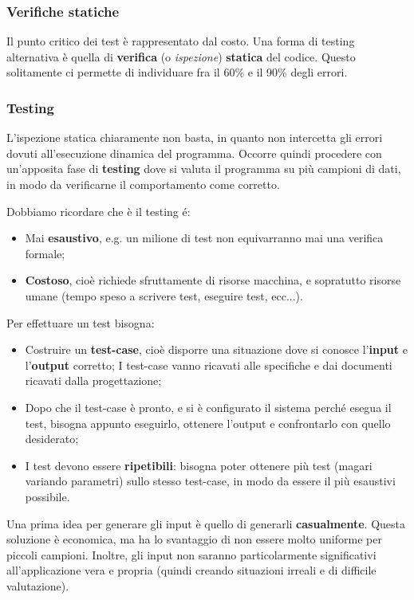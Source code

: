 \documentclass[a4paper,11pt]{article}
\begin{document}
\subsubsection{Verifiche statiche}
Il punto critico dei test è rappresentato dal costo. Una forma di testing alternativa è quella di \textbf{verifica} (o \textit{ispezione}) \textbf{statica} del codice.
Questo solitamente ci permette di individuare fra il 60\% e il 90\% degli errori.

\subsubsection{Testing}
L'ispezione statica chiaramente non basta, in quanto non intercetta gli errori dovuti all'esecuzione dinamica del programma.
Occorre quindi procedere con un'apposita fase di \textbf{testing} dove si valuta il programma su più campioni di dati, in modo da verificarne il comportamento come corretto.

Dobbiamo ricordare che è il testing é:
\begin{itemize}
	\item Mai \textbf{esaustivo}, e.g. un milione di test non equivarranno mai una verifica formale;
	\item \textbf{Costoso}, cioè richiede sfruttamente di risorse macchina, e sopratutto risorse umane (tempo speso a scrivere test, eseguire test, ecc...).
\end{itemize}

Per effettuare un test bisogna:
\begin{itemize}
	\item Costruire un \textbf{test-case}, cioè disporre una situazione dove si conosce l'\textbf{input} e l'\textbf{output} corretto;
	I test-case vanno ricavati alle specifiche e dai documenti ricavati dalla progettazione;
	\item Dopo che il test-case è pronto, e si è configurato il sistema perché esegua il test, bisogna appunto eseguirlo, ottenere l'output e confrontarlo con quello desiderato;
	\item I test devono essere \textbf{ripetibili}: bisogna poter ottenere più test (magari variando parametri) sullo stesso test-case, in modo da essere il più esaustivi possibile.
\end{itemize}

Una prima idea per generare gli input è quello di generarli \textbf{casualmente}.
Questa soluzione è economica, ma ha lo svantaggio di non essere molto uniforme per piccoli campioni. Inoltre, gli input non saranno particolarmente significativi all'applicazione vera e propria (quindi creando situazioni irreali e di difficile valutazione).
\end{document}
